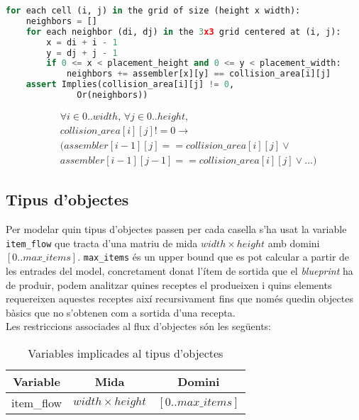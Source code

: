 \begin{lstlisting}[language=Python, caption=Link Assembler Collision]
for each cell (i, j) in the grid of size (height x width):
    neighbors = []
    for each neighbor (di, dj) in the 3x3 grid centered at (i, j):
        x = di + i - 1
        y = dj + j - 1
        if 0 <= x < placement_height and 0 <= y < placement_width:
            neighbors += assembler[x][y] == collision_area[i][j]
    assert Implies(collision_area[i][j] != 0,
              Or(neighbors))

\end{lstlisting}
\begin{align*}
    &\forall i \in 0..width, \, \forall j \in 0..height, \\
    &collision\_area[i][j] != 0 \rightarrow \\
    &(assembler[i-1][j] == collision\_area[i][j] \lor \\
    &assembler[i-1][j-1] == collision\_area[i][j] \lor ...)
\end{align*}


\subsection{Tipus d'objectes}
Per modelar quin tipus d'objectes passen per cada casella s'ha usat la variable \texttt{item\_flow} que tracta d'una matriu de mida $width \times height$ amb domini $[0..max\_items]$. \texttt{max\_items} és un upper bound que es pot calcular a partir de les entrades del model, concretament donat l'ítem de sortida que el \textit{blueprint} ha de produir, podem analitzar quines receptes el produeixen i quins elements requereixen aquestes receptes així recursivament fins que només quedin objectes bàsics que no s'obtenen com a sortida d'una recepta.\\
Les restriccions associades al flux d'objectes són les següents:
\begin{table}[h]
    \centering
    \begin{tabular}{|c|c|c|}
    \hline
    \textbf{Variable} & \textbf{Mida} & \textbf{Domini} \\
    \hline
    item\_flow & $width \times height$ & $[0..max\_items]$ \\
    \hline
    \end{tabular}
    \caption{Variables implicades al tipus d'objectes}
    \label{item_flow-variables}
\end{table}

